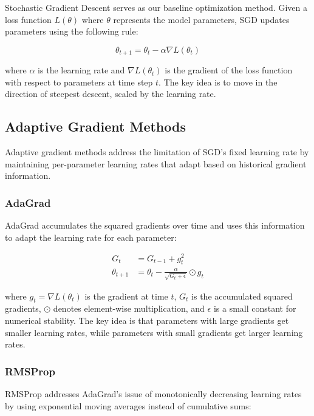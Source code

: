 \documentclass[12pt]{article}
\begin{document}
Stochastic Gradient Descent serves as our baseline optimization method. Given a loss function $L(\theta)$ where $\theta$ represents the model parameters, SGD updates parameters using the following rule:

\begin{equation}
\theta_{t+1} = \theta_t - \alpha \nabla L(\theta_t)
\end{equation}

where $\alpha$ is the learning rate and $\nabla L(\theta_t)$ is the gradient of the loss function with respect to parameters at time step $t$. The key idea is to move in the direction of steepest descent, scaled by the learning rate.

\subsection{Adaptive Gradient Methods}

Adaptive gradient methods address the limitation of SGD's fixed learning rate by maintaining per-parameter learning rates that adapt based on historical gradient information.

\subsubsection{AdaGrad}

AdaGrad accumulates the squared gradients over time and uses this information to adapt the learning rate for each parameter:

\begin{align}
G_t &= G_{t-1} + g_t^2 \\
\theta_{t+1} &= \theta_t - \frac{\alpha}{\sqrt{G_t + \epsilon}} \odot g_t
\end{align}

where $g_t = \nabla L(\theta_t)$ is the gradient at time $t$, $G_t$ is the accumulated squared gradients, $\odot$ denotes element-wise multiplication, and $\epsilon$ is a small constant for numerical stability. The key idea is that parameters with large gradients get smaller learning rates, while parameters with small gradients get larger learning rates.

\subsubsection{RMSProp}

RMSProp addresses AdaGrad's issue of monotonically decreasing learning rates by using exponential moving averages instead of cumulative sums:
\end{document}
